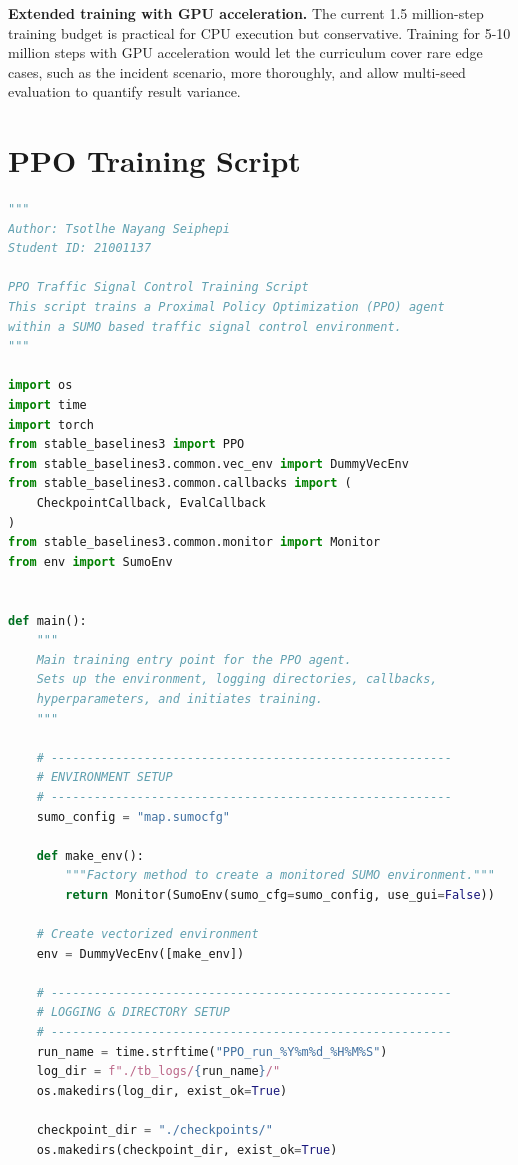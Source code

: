 ﻿\documentclass[11pt, a4paper]{report}
\begin{document}
\textbf{Extended training with GPU acceleration.}  The current 1.5 million-step training budget is practical for CPU execution but
  conservative. Training for 5-10 million steps with GPU acceleration would let
  the curriculum cover rare edge cases, such as the incident scenario, more
  thoroughly, and allow multi-seed evaluation to quantify result variance.



\appendix

\chapter{PPO Training Script}

\begin{lstlisting}[language=Python, caption={PPO Training Script, Tsotlhe N. Seiphepi (ID: 21001137)}]
"""
Author: Tsotlhe Nayang Seiphepi
Student ID: 21001137

PPO Traffic Signal Control Training Script
This script trains a Proximal Policy Optimization (PPO) agent
within a SUMO based traffic signal control environment.
"""

import os
import time
import torch
from stable_baselines3 import PPO
from stable_baselines3.common.vec_env import DummyVecEnv
from stable_baselines3.common.callbacks import (
    CheckpointCallback, EvalCallback
)
from stable_baselines3.common.monitor import Monitor
from env import SumoEnv


def main():
    """
    Main training entry point for the PPO agent.
    Sets up the environment, logging directories, callbacks,
    hyperparameters, and initiates training.
    """

    # --------------------------------------------------------
    # ENVIRONMENT SETUP
    # --------------------------------------------------------
    sumo_config = "map.sumocfg"

    def make_env():
        """Factory method to create a monitored SUMO environment."""
        return Monitor(SumoEnv(sumo_cfg=sumo_config, use_gui=False))

    # Create vectorized environment
    env = DummyVecEnv([make_env])

    # --------------------------------------------------------
    # LOGGING & DIRECTORY SETUP
    # --------------------------------------------------------
    run_name = time.strftime("PPO_run_%Y%m%d_%H%M%S")
    log_dir = f"./tb_logs/{run_name}/"
    os.makedirs(log_dir, exist_ok=True)

    checkpoint_dir = "./checkpoints/"
    os.makedirs(checkpoint_dir, exist_ok=True)


\end{lstlisting}
\end{document}
